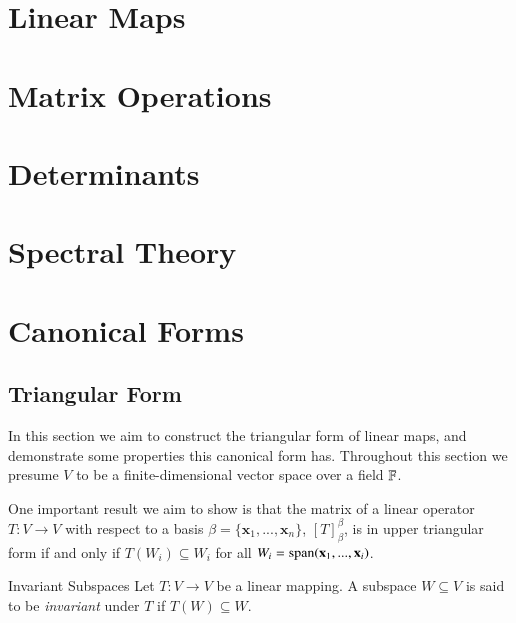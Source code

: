 \documentclass[12pt]{report}
\newcommand{\mb}[1]{\mathbf{#1}}
\begin{document}
\chapter{Linear Maps}




\chapter{Matrix Operations}



\chapter{Determinants}



\chapter{Spectral Theory}



\chapter{Canonical Forms}

\section{Triangular Form}

In this section we aim to construct the triangular form of linear maps, and demonstrate some properties this canonical form has. Throughout this section we presume $V$ to be a finite-dimensional vector space over a field $\mathbb F$. 


One important result we aim to show is that the matrix of a linear operator $T:V \rightarrow V$ with respect to a basis $\beta = \{\mb x_1,...,\mb x_n\}$, $[T]_{\beta}^{\beta}$, is in upper triangular form if and only if $T(W_i) \subseteq W_i$ for all $W_i = \spn(\mb x_1,...,\mb x_i)$.

\begin{defn}{Invariant Subspaces}{}
    Let $T:V \rightarrow V$ be a linear mapping. A subspace $W \subseteq V$ is said to be \emph{invariant} under $T$ if $T(W) \subseteq W$.
\end{defn}
\end{document}
